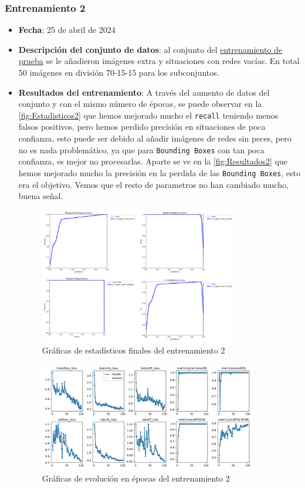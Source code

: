 \subsubsection*{Entrenamiento 2}
\label{train:2}
\begin{itemize}
    \item \textbf{Fecha}: 25 de abril de 2024
    \item \textbf{Descripción del conjunto de datos}: al conjunto del \hyperref[train:1]{entrenamiento de prueba} se le añadieron imágenes extra y situaciones con redes vacías. En total 50 imágenes en división 70-15-15 para los subconjuntos.
    \item \textbf{Resultados del entrenamiento}: A través del aumento de datos del conjunto y con el mismo número de épocas, se puede observar en la \autoref{fig:Estadisticos2} que hemos mejorado mucho el \texttt{recall} teniendo menos falsos positivos, 
    pero hemos perdido precisión en situaciones de poca confianza, esto puede ser debido al añadir imágenes de redes sin peces, pero no es nada problemático, ya que para \texttt{Bounding Boxes} con tan poca confianza, es mejor no procesarlas. 
    Aparte se ve en la \autoref{fig:Resultados2} que hemos mejorado mucho la precisión en la perdida de las \texttt{Bounding Boxes}, esto era el objetivo. Vemos que el resto de parametros no han cambiado mucho, buena señal.
    \begin{figure}[H]
        \centering
        \includegraphics[width=0.82\textwidth]{images/13/b/2/graficas2.png}
        \caption{Gráficas de estadísticos finales del entrenamiento 2}
        \label{fig:Estadisticos2}
    \end{figure}
    \begin{figure}[H]
        \centering
        \includegraphics[width=0.9\textwidth]{images/13/b/2/results.png}
        \caption{Gráficas de evolución en épocas del entrenamiento 2}
        \label{fig:Resultados2}
    \end{figure}
\end{itemize}
